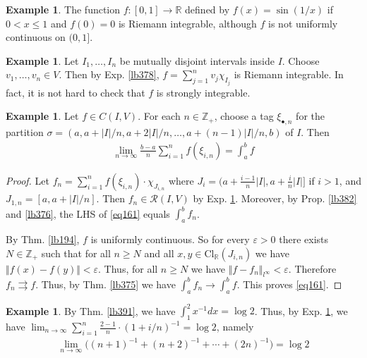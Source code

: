 \documentclass[12pt,b5paper,notitlepage]{article}
\theoremstyle{definition}
\newtheorem{eg}[df]{Example}
\theoremstyle{plain}
\newcommand{\scr}{\mathscr}
\newcommand{\blt}{\bullet}
\newcommand{\Zbb}{\mathbb Z}
\newcommand{\Rbb}{\mathbb R}
\newcommand{\Cl}{\mathrm{Cl}}
\newcommand{\eps}{\varepsilon}
\numberwithin{equation}{section}
\begin{document}
\begin{eg}
The function $f:[0,1]\rightarrow\Rbb$ defined by $f(x)=\sin(1/x)$ if $0<x\leq 1$ and $f(0)=0$ is Riemann integrable, although $f$ is not uniformly continuous on $(0,1]$.
\end{eg}

\begin{eg}\label{lb388}
Let $I_1,\dots,I_n$ be mutually disjoint intervals inside $I$. Choose $v_1,\dots,v_n\in V$. Then by Exp. \ref{lb378}, $f=\sum_{j=1}^n v_j\chi_{I_j}$ is Riemann integrable. In fact, it is not hard to check that $f$ is strongly integrable.
\end{eg}



\begin{eg}\label{lb383}
Let $f\in C(I,V)$. For each $n\in\Zbb_+$, choose a tag $\xi_{\blt,n}$ for the partition $\sigma=(a,a+|I|/n,a+2|I|/n,\dots,a+(n-1)|I|/n,b)$ of $I$. Then
\begin{align}
\lim_{n\rightarrow\infty} \frac {b-a}n\sum_{i=1}^n f(\xi_{i,n})=\int_a^bf  \label{eq161}
\end{align}
\end{eg}



\begin{proof}
Let $f_n=\sum_{i=1}^n f(\xi_{i,n})\cdot\chi_{J_{i,n}}$ where $J_i=\big(a+\frac{i-1}n|I|,a+\frac in|I|\big]$ if $i>1$, and $J_{1,n}=[a,a+|I|/n]$. Then $f_n\in\scr R(I,V)$ by Exp. \ref{lb388}. Moreover, by Prop. \ref{lb382} and \ref{lb376}, the LHS of \eqref{eq161} equals $\int_a^b f_n$.

By Thm. \ref{lb194}, $f$ is uniformly continuous. So for every $\eps>0$ there exists $N\in\Zbb_+$ such that for all $n\geq N$ and all $x,y\in \Cl_\Rbb(J_{i,n})$ we have $\Vert f(x)-f(y)\Vert<\eps$. Thus, for all $n\geq N$ we have $\Vert f-f_n\Vert_{l^\infty}<\eps$. Therefore $f_n\rightrightarrows f$. Thus, by Thm. \ref{lb375} we have $\int_a^b f_n\rightarrow\int_a^b f$. This proves \eqref{eq161}.
\end{proof}



\begin{eg}
By Thm. \ref{lb391}, we have $\int_1^2x^{-1}dx=\log 2$. Thus, by Exp. \ref{lb383}, we have $\lim_{n\rightarrow\infty}\sum_{i=1}^n\frac{2-1}{n}\cdot (1+i/n)^{-1}=\log 2$, namely
\begin{align*}
\lim_{n\rightarrow\infty}\big((n+1)^{-1}+(n+2)^{-1}+\cdots+(2n)^{-1} \big)=\log 2
\end{align*}
\end{eg}
\end{document}

